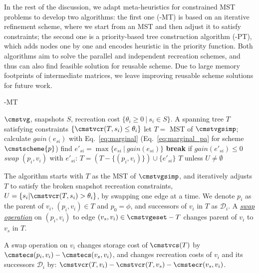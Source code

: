 \documentclass[conference]{IEEEtran}
\begin{document}
In the rest of the discussion, we adapt meta-heuristics for constrained MST
problems to develop two algorithms: the first one (\weightstore-MT) is based on
an iterative refinement scheme, where we start from an MST and then adjust it to
satisfy constraints; the second one is a priority-based tree construction
algorithm (\weightstore-PT), which adds nodes one by one and encodes heuristic
in the priority function. Both algorithms aim to solve the parallel and
independent recreation schemes, and thus can also find feasible solution for reusable
scheme. Due to large memory footprints of intermediate matrices, we leave
improving reusable scheme solutions for future work.

\begin{algorithm}[t!] 
\caption{\weightstore-MT}
\label{alg:pas_mt}{\small{
\begin{algorithmic}[1]
\REQUIRE $\cmstvg$, snapshots $S$, recreation cost $\{\theta_i \geq 0\ |\ s_i \in S\}$.
\ENSURE A spanning tree $T$ satisfying constraints $\{\cmstvcr(T, s_i) \leq \theta_i\}$
\STATE let $T = $ MST of $\cmstvgsimp$; 
  \STATE calculate $gain(e_{si})$  with Eq.~\ref{eq:marginal} (Eq.~\ref{eq:marginal_pa} for scheme $\cmstscheme{p}$)
\ENDFOR
\STATE find $e'_{si} = \max\{e_{si}\ |\ gain(e_{si}) \}$
\STATE \textbf{break} if $gain(e'_{si}) \leq 0$
\STATE \emph{swap} $(p_i, v_i)$ with $e'_{si}$: $T = (T - \{(p_i, v_i)\} ) \cup \{e'_{si}\}$
\ENDWHILE
\RETURN $T$ unless $U \neq \emptyset$
\end{algorithmic}
}}
\end{algorithm}

 The algorithm starts with $T$ as the MST of $\cmstvgsimp$, and iteratively adjusts $T$ to satisfy the broken snapshot recreation 
constraints, $U = \{s_i | \cmstvcr(T, s_i) > \theta_i\}$, by swapping one edge at a time. 
We denote $p_i$ as the parent of $v_i$, $(p_i, v_i) \in T$ and $p_0 = \phi$, and successors of $v_i$ in $T$ as $\mathcal{D}_i$. A \underline{\emph{swap operation}} on $(p_i, v_i)$ to edge $(v_s, v_i) \in \cmstvgeset - T$ changes parent of $v_i$ to $v_s$ in $T$. %
\begin{lemma}
\label{lm:swap}
A swap operation on $v_i$ changes storage cost of $\cmstvcs(T)$ by $\cmstecs(p_i, v_i) - \cmstecs(v_s, v_i)$, and changes recreation costs of $v_i$ and its successors $ \mathcal{D}_i$ by: $\cmstvcr(T, v_i) - \cmstvcr(T, v_s) - \cmstecr(v_s, v_i)$. %
\end{lemma}
\end{document}
